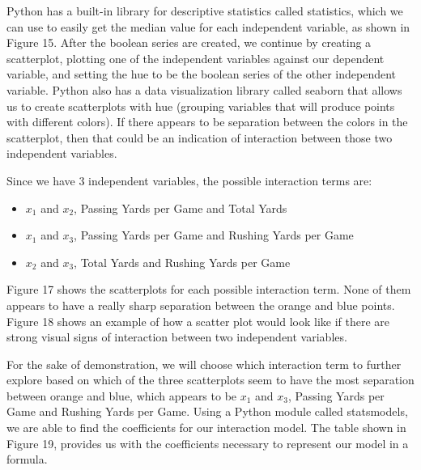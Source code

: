 \documentclass[a4paper,12pt]{report}
\begin{document}
Python has a built-in library for descriptive statistics called statistics, which we can use to easily get the median value for each independent variable, as shown in Figure 15. After the boolean series are created, we continue by creating a scatterplot, plotting one of the independent variables against our dependent variable, and setting the hue to be the boolean series of the other independent variable. Python also has a data visualization library called seaborn that allows us to create scatterplots with hue (grouping variables that will produce points with different colors). If there appears to be separation between the colors in the scatterplot, then that could be an indication of interaction between those two independent variables. 

Since we have 3 independent variables, the possible interaction terms are:
\begin{itemize}[,]
    \setlength\itemsep{-.1cm}
    \item $x_1$ and $x_2$, Passing Yards per Game and Total Yards
    \item $x_1$ and $x_3$, Passing Yards per Game and Rushing Yards per Game
    \item $x_2$ and $x_3$, Total Yards and Rushing Yards per Game
\end{itemize}

Figure 17 shows the scatterplots for each possible interaction term. None of them appears to have a really sharp separation between the orange and blue points. Figure 18 shows an example of how a scatter plot would look like if there are strong visual signs of interaction between two independent variables.

For the sake of demonstration, we will choose which interaction term to further explore based on which of the three scatterplots seem to have the most separation between orange and blue, which appears to be $x_1$ and $x_3$, Passing Yards per Game and Rushing Yards per Game. Using a Python module called statsmodels, we are able to find the coefficients for our interaction model. The table shown in Figure 19, provides us with the coefficients necessary to represent our model in a formula.
\end{document}
